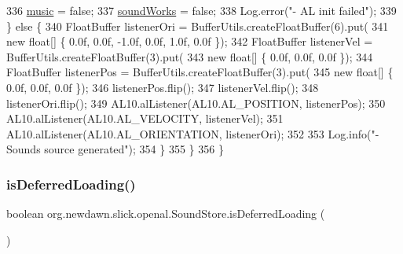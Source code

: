 \begin{DoxyCode}
336                 \mbox{\hyperlink{classorg_1_1newdawn_1_1slick_1_1openal_1_1_sound_store_a7e15ee371935f6d530e4481ac9e2bd7e}{music}} = \textcolor{keyword}{false};
337                 \mbox{\hyperlink{classorg_1_1newdawn_1_1slick_1_1openal_1_1_sound_store_ae563e9c1a01e333dc2350f1450f451fd}{soundWorks}} = \textcolor{keyword}{false};
338                 Log.error(\textcolor{stringliteral}{"- AL init failed"});
339             \} \textcolor{keywordflow}{else} \{
340                 FloatBuffer listenerOri = BufferUtils.createFloatBuffer(6).put(
341                         \textcolor{keyword}{new} \textcolor{keywordtype}{float}[] \{ 0.0f, 0.0f, -1.0f, 0.0f, 1.0f, 0.0f \});
342                 FloatBuffer listenerVel = BufferUtils.createFloatBuffer(3).put(
343                         \textcolor{keyword}{new} \textcolor{keywordtype}{float}[] \{ 0.0f, 0.0f, 0.0f \});
344                 FloatBuffer listenerPos = BufferUtils.createFloatBuffer(3).put(
345                         \textcolor{keyword}{new} \textcolor{keywordtype}{float}[] \{ 0.0f, 0.0f, 0.0f \});
346                 listenerPos.flip();
347                 listenerVel.flip();
348                 listenerOri.flip();
349                 AL10.alListener(AL10.AL\_POSITION, listenerPos);
350                 AL10.alListener(AL10.AL\_VELOCITY, listenerVel);
351                 AL10.alListener(AL10.AL\_ORIENTATION, listenerOri);
352              
353                 Log.info(\textcolor{stringliteral}{"- Sounds source generated"});
354             \}
355         \}
356     \}
\end{DoxyCode}
\mbox{\label{classorg_1_1newdawn_1_1slick_1_1openal_1_1_sound_store_ae76241f855bad0a9101682ad5f93475d}} 
\subsubsection{\texorpdfstring{is\+Deferred\+Loading()}{isDeferredLoading()}}
{\footnotesize\ttfamily boolean org.\+newdawn.\+slick.\+openal.\+Sound\+Store.\+is\+Deferred\+Loading (\begin{DoxyParamCaption}{ }\end{DoxyParamCaption})\hspace{0.3cm}{\ttfamily [inline]}}

